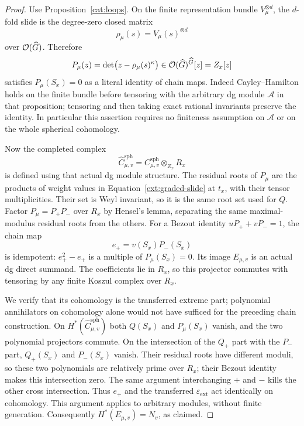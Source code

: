 \begin{proof}
 Use Proposition~\ref{cat:loops}.  On the finite representation
 bundle $V_\mu^{\otimes d}$, the $d$-fold slide is the degree-zero
 closed matrix
 \[
       \rho_\mu(s)=V_\mu(s)^{\otimes d}
 \]
 over $\mathcal O(\widehat G)$.  Therefore
 \[
       P_\mu(z)=\det\bigl(z-\rho_\mu(s)^\kappa\bigr)
                  \in\mathcal O(\widehat G)^{\widehat G}[z]=Z_x[z]
 \]
 satisfies $P_\mu(S_x)=0$ as a literal identity of chain maps.
 Indeed Cayley--Hamilton holds on the finite bundle before tensoring
 with the arbitrary dg module $\mathcal A$ in that proposition;
 tensoring and then taking exact rational invariants preserve the
 identity.  In particular this assertion requires no finiteness
 assumption on $\mathcal A$ or on the whole spherical cohomology.

 Now the completed complex
 \[
    \widehat C_{\mu,v}^{\mathrm{sph}}
          =C_{\mu,v}^{\mathrm{sph}}\otimes_{Z_x}R_x
 \]
 is defined using that actual dg module structure.
 The residual roots of $P_\mu$ are the products of weight values
 in Equation~\eqref{ext:graded-slide} at $t_x$, with their tensor
 multiplicities.  Their set is Weyl invariant, so it is the same
 root set used for $Q$.
 Factor $P_\mu=P_+P_-$ over $R_x$ by Hensel's lemma, separating the
 same maximal-modulus residual roots from the others.  For a Bezout
 identity $uP_++vP_-=1$, the chain map
 \[
                  e_+=v(S_x)P_-(S_x)
 \]
 is idempotent: $e_+^2-e_+$ is a multiple of $P_\mu(S_x)=0$.
 Its image $E_{\mu,v}$ is an actual dg direct summand.
 The coefficients lie in $R_x$, so this projector commutes with
 tensoring by any finite Koszul complex over $R_x$.

 We verify that its cohomology is the transferred extreme part;
 polynomial annihilators on cohomology alone would not have
 sufficed for the preceding chain construction.  On
 $H^*(\widehat C_{\mu,v}^{\mathrm{sph}})$ both $Q(S_x)$ and
 $P_\mu(S_x)$ vanish, and the two polynomial projectors commute.
 On the intersection of the $Q_+$ part with the $P_-$ part,
 $Q_+(S_x)$ and $P_-(S_x)$ vanish.  Their residual roots have
 different moduli, so these two polynomials are relatively prime
 over $R_x$; their Bezout identity makes this intersection zero.
 The same argument interchanging $+$ and $-$ kills the other
 cross intersection.  Thus $e_+$ and the transferred
 $\varepsilon_{\mathrm{ext}}$ act identically on cohomology.
 This argument applies to arbitrary modules, without finite
 generation.  Consequently $H^*(E_{\mu,v})=N_v$, as claimed.
\end{proof}

